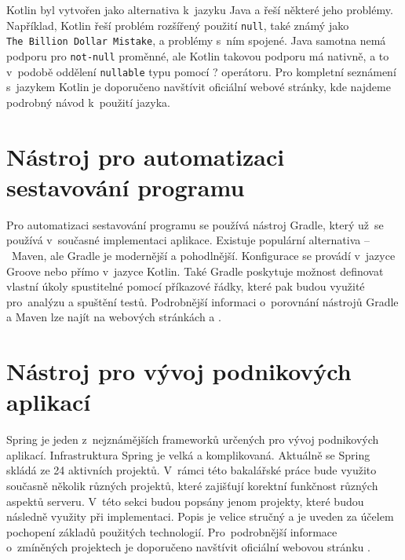     
    Kotlin byl vytvořen jako alternativa k~jazyku Java a řeší některé jeho problémy. Například, Kotlin řeší problém rozšířený použití \texttt{null}, také známý jako \texttt{The~Billion~Dollar~Mistake}, a problémy s~ním spojené. Java samotna nemá podporu pro \texttt{not-null} proměnné, ale Kotlin takovou podporu má nativně, a to v~podobě oddělení \texttt{nullable} typu pomocí ? operátoru. Pro kompletní seznámení s~jazykem Kotlin je doporučeno navštívit oficiální webové stránky, kde najdeme podrobný návod k~použití jazyka.\cite{kotlin-documentation}
    

\section{Nástroj pro automatizaci sestavování programu}\label{resere:build}
    Pro automatizaci sestavování programu se používá nástroj Gradle, který už~se používá v~současné implementaci aplikace. Existuje populární alternativa --~Maven, ale Gradle je modernější a pohodlnější. Konfigurace se provádí v~jazyce Groove nebo přímo v~jazyce Kotlin. Také Gradle poskytuje možnost definovat vlastní úkoly spustitelné pomocí příkazové řádky, které pak budou využité pro~analýzu a spuštění testů. Podrobnější informaci o~porovnání nástrojů Gradle a Maven lze najít na webových stránkách \cite{grale-vs-mavem} a \cite{gradle-vs-maven-bealdung}.

\section{Nástroj pro vývoj podnikových aplikací}\label{resere:j2ee}
    Spring je jeden z~nejznámějších frameworků určených pro vývoj podnikových aplikací. Infrastruktura Spring je velká a komplikovaná. Aktuálně se Spring skládá ze 24 aktivních projektů. V~rámci této bakalářské práce bude využito současně několik různých projektů, které zajišťují korektní funkčnost různých aspektů serveru. V~této sekci budou popsány jenom projekty, které budou následně využity při implementaci. Popis je velice stručný a je uveden za účelem pochopení základů použitých technologií. Pro~podrobnější informace o~zmíněných projektech je doporučeno navštívit oficiální webovou stránku \cite{spring-projects}.
    
